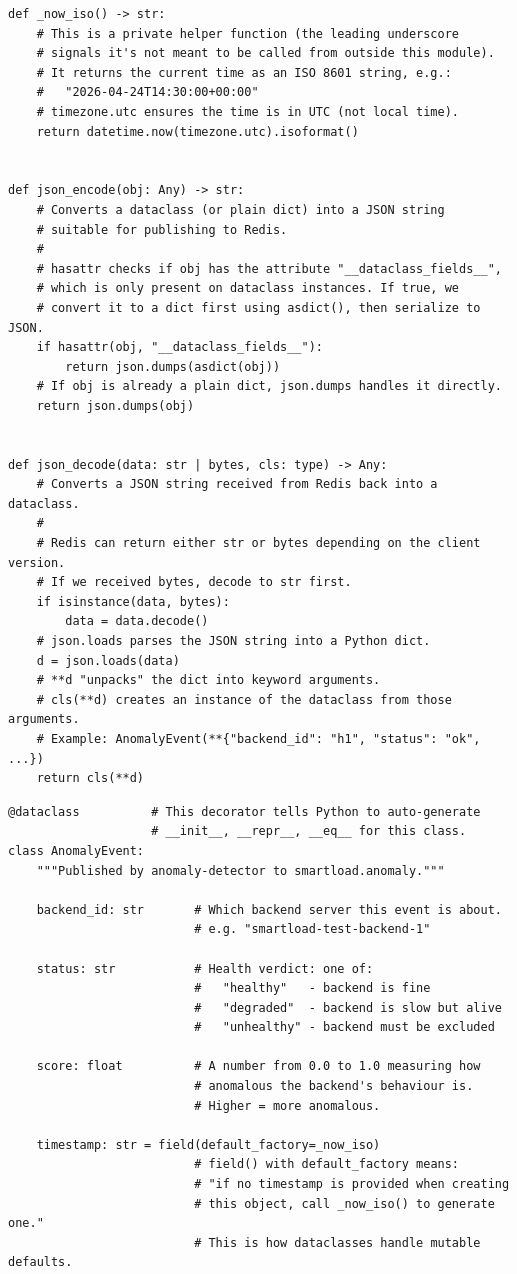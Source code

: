 \documentclass[12pt, a4paper]{article}
\begin{document}
\begin{lstlisting}[style=python, caption={Helper functions in contracts.py}]
def _now_iso() -> str:
    # This is a private helper function (the leading underscore
    # signals it's not meant to be called from outside this module).
    # It returns the current time as an ISO 8601 string, e.g.:
    #   "2026-04-24T14:30:00+00:00"
    # timezone.utc ensures the time is in UTC (not local time).
    return datetime.now(timezone.utc).isoformat()


def json_encode(obj: Any) -> str:
    # Converts a dataclass (or plain dict) into a JSON string
    # suitable for publishing to Redis.
    #
    # hasattr checks if obj has the attribute "__dataclass_fields__",
    # which is only present on dataclass instances. If true, we
    # convert it to a dict first using asdict(), then serialize to JSON.
    if hasattr(obj, "__dataclass_fields__"):
        return json.dumps(asdict(obj))
    # If obj is already a plain dict, json.dumps handles it directly.
    return json.dumps(obj)


def json_decode(data: str | bytes, cls: type) -> Any:
    # Converts a JSON string received from Redis back into a dataclass.
    #
    # Redis can return either str or bytes depending on the client version.
    # If we received bytes, decode to str first.
    if isinstance(data, bytes):
        data = data.decode()
    # json.loads parses the JSON string into a Python dict.
    d = json.loads(data)
    # **d "unpacks" the dict into keyword arguments.
    # cls(**d) creates an instance of the dataclass from those arguments.
    # Example: AnomalyEvent(**{"backend_id": "h1", "status": "ok", ...})
    return cls(**d)
\end{lstlisting}

\begin{lstlisting}[style=python, caption={AnomalyEvent dataclass in contracts.py}]
@dataclass          # This decorator tells Python to auto-generate
                    # __init__, __repr__, __eq__ for this class.
class AnomalyEvent:
    """Published by anomaly-detector to smartload.anomaly."""

    backend_id: str       # Which backend server this event is about.
                          # e.g. "smartload-test-backend-1"

    status: str           # Health verdict: one of:
                          #   "healthy"   - backend is fine
                          #   "degraded"  - backend is slow but alive
                          #   "unhealthy" - backend must be excluded

    score: float          # A number from 0.0 to 1.0 measuring how
                          # anomalous the backend's behaviour is.
                          # Higher = more anomalous.

    timestamp: str = field(default_factory=_now_iso)
                          # field() with default_factory means:
                          # "if no timestamp is provided when creating
                          # this object, call _now_iso() to generate one."
                          # This is how dataclasses handle mutable defaults.
\end{lstlisting}
\end{document}
